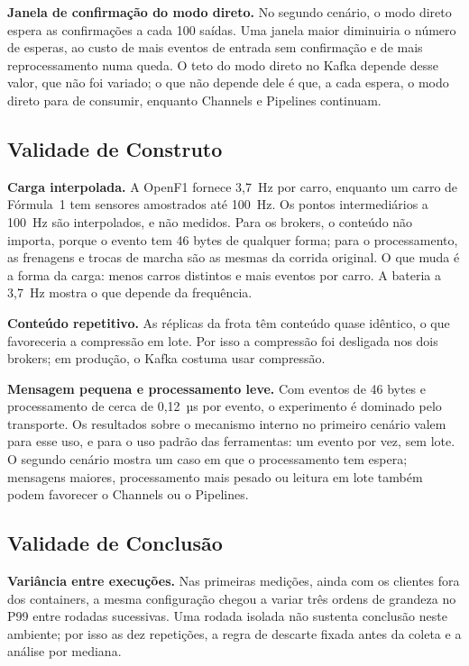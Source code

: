 \documentclass[12pt]{article}
\begin{document}
\textbf{Janela de confirmação do modo direto.} No segundo cenário, o modo direto espera
as confirmações a cada 100 saídas. Uma janela maior diminuiria o número de esperas, ao
custo de mais eventos de entrada sem confirmação e de mais reprocessamento numa queda.
O teto do modo direto no Kafka depende desse valor, que não foi variado; o que não
depende dele é que, a cada espera, o modo direto para de consumir, enquanto Channels e
Pipelines continuam.

\subsection{Validade de Construto}

\textbf{Carga interpolada.} A OpenF1 fornece 3,7~Hz por carro, enquanto um carro de
Fórmula~1 tem sensores amostrados até 100~Hz. Os pontos intermediários a 100~Hz são
interpolados, e não medidos. Para os brokers, o conteúdo não importa, porque o evento tem
46 bytes de qualquer forma; para o processamento, as frenagens e trocas de marcha são as
mesmas da corrida original. O que muda é a forma da carga: menos carros distintos e mais
eventos por carro. A bateria a 3,7~Hz mostra o que depende da frequência.

\textbf{Conteúdo repetitivo.} As réplicas da frota têm conteúdo quase idêntico, o que
favoreceria a compressão em lote. Por isso a compressão foi desligada nos dois brokers;
em produção, o Kafka costuma usar compressão.

\textbf{Mensagem pequena e processamento leve.} Com eventos de 46 bytes e processamento de
cerca de 0,12~µs por evento, o experimento é dominado pelo transporte. Os resultados sobre
o mecanismo interno no primeiro cenário valem para esse uso, e para o uso padrão das
ferramentas: um evento por vez, sem lote. O segundo cenário mostra um caso em que o
processamento tem espera; mensagens maiores, processamento mais pesado ou leitura em lote
também podem favorecer o Channels ou o Pipelines.

\subsection{Validade de Conclusão}

\textbf{Variância entre execuções.} Nas primeiras medições, ainda com os clientes fora
dos containers, a mesma configuração chegou a variar três ordens de grandeza no P99 entre
rodadas sucessivas. Uma rodada isolada não sustenta
conclusão neste ambiente; por isso as dez repetições, a regra de descarte fixada antes
da coleta e a análise por mediana.
\end{document}
